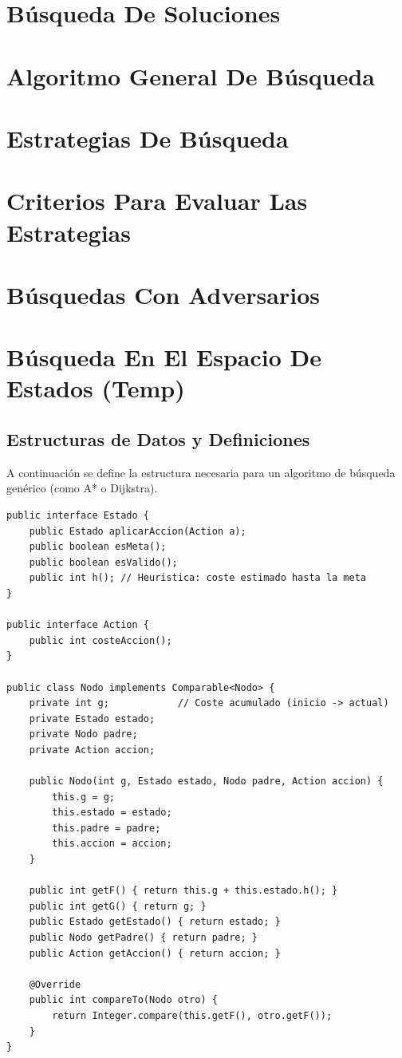 \section{Búsqueda De Soluciones}

\section{Algoritmo General De Búsqueda}

\section{Estrategias De Búsqueda}

\section{Criterios Para Evaluar Las Estrategias}

\section{Búsquedas Con Adversarios}



\section{Búsqueda En El Espacio De Estados (Temp)}


\subsection{Estructuras de Datos y Definiciones}
A continuación se define la estructura necesaria para un algoritmo de búsqueda genérico (como A* o Dijkstra).

\begin{lstlisting}[caption=Interfaces y Clase Nodo]
public interface Estado {
    public Estado aplicarAccion(Action a);
    public boolean esMeta();
    public boolean esValido();
    public int h(); // Heuristica: coste estimado hasta la meta
}

public interface Action {
    public int costeAccion();
}

public class Nodo implements Comparable<Nodo> {
    private int g;            // Coste acumulado (inicio -> actual)
    private Estado estado;
    private Nodo padre;
    private Action accion;

    public Nodo(int g, Estado estado, Nodo padre, Action accion) {
        this.g = g;
        this.estado = estado;
        this.padre = padre;
        this.accion = accion;
    }

    public int getF() { return this.g + this.estado.h(); }
    public int getG() { return g; }
    public Estado getEstado() { return estado; }
    public Nodo getPadre() { return padre; }
    public Action getAccion() { return accion; }

    @Override
    public int compareTo(Nodo otro) {
        return Integer.compare(this.getF(), otro.getF());
    }
}
\end{lstlisting}

